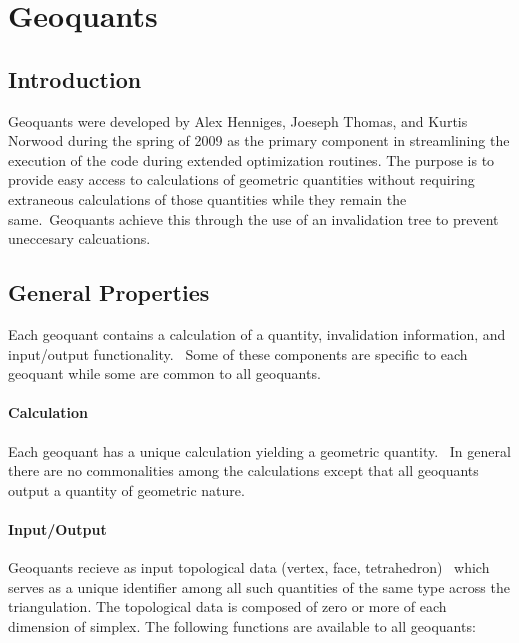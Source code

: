                       


\chapter{Geoquants}

\section{Introduction}

Geoquants were developed by Alex Henniges, Joeseph Thomas, and Kurtis
Norwood during the spring of 2009 as the primary component in streamlining
the execution of the code during extended optimization routines. The purpose
is to provide easy access to calculations of geometric quantities without
requiring extraneous calculations of those quantities while they remain the
same.\ Geoquants achieve this through the use of an invalidation tree to
prevent uneccesary calcuations.\bigskip 

\section{General Properties}

Each geoquant contains a calculation of a quantity, invalidation
information, and input/output functionality. \ Some of these components are
specific to each geoquant while some are common to all geoquants.

\subsubsection{Calculation}

Each geoquant has a unique calculation yielding a geometric quantity. \ In
general there are no commonalities among the calculations except that all
geoquants output a quantity of geometric nature. \ 

\subsubsection{Input/Output}

Geoquants recieve as input topological data (vertex, face, tetrahedron) \
which serves as a unique identifier among all such quantities of the same
type across the triangulation. The topological data is composed of zero or
more of each dimension of simplex. The following functions are available to
all geoquants:

